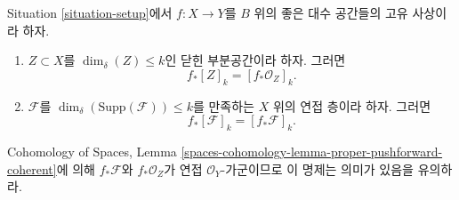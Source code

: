 \begin{lemma}
\label{lemma-cycle-push-sheaf}
Situation \ref{situation-setup}에서 $f : X \to Y$를 $B$ 위의 좋은 대수
공간들의 고유 사상이라 하자.
\begin{enumerate}
\item $Z \subset X$를 $\dim_\delta(Z) \leq k$인 닫힌 부분공간이라 하자.
그러면
$$
f_*[Z]_k = [f_*{\mathcal O}_Z]_k.
$$
\item $\mathcal{F}$를 $\dim_\delta(\text{Supp}(\mathcal{F})) \leq k$를
만족하는 $X$ 위의 연접 층이라 하자. 그러면
$$
f_*[\mathcal{F}]_k = [f_*{\mathcal F}]_k.
$$
\end{enumerate}
Cohomology of Spaces, Lemma
\ref{spaces-cohomology-lemma-proper-pushforward-coherent}에 의해
$f_*\mathcal{F}$와 $f_*\mathcal{O}_Z$가 연접 $\mathcal{O}_Y$-가군이므로
이 명제는 의미가 있음을 유의하라.
\end{lemma}

